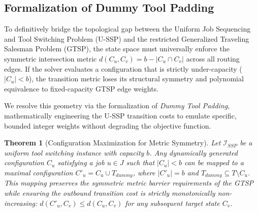 \documentclass[11pt, a4paper]{book}
\newtheorem{theorem}{Theorem}[chapter]
\begin{document}
	\subsection{Formalization of Dummy Tool Padding}
	
	To definitively bridge the topological gap between the Uniform Job Sequencing and Tool Switching Problem (U-SSP) and the restricted Generalized Traveling Salesman Problem (GTSP), the state space must universally enforce the symmetric intersection metric $d(C_u, C_v) = b - |C_u \cap C_v|$ across all routing edges. If the solver evaluates a configuration that is strictly under-capacity ($|C_u| < b$), the transition metric loses its structural symmetry and polynomial equivalence to fixed-capacity GTSP edge weights. 
	
	We resolve this geometry via the formalization of \textit{Dummy Tool Padding}, mathematically engineering the U-SSP transition costs to emulate specific, bounded integer weights without degrading the objective function.
	
	\begin{theorem}[Configuration Maximization for Metric Symmetry]
		Let $\mathcal{I}_{SSP}$ be a uniform tool switching instance with capacity $b$. Any dynamically generated configuration $C_u$ satisfying a job $u \in J$ such that $|C_u| < b$ can be mapped to a maximal configuration $C'_u = C_u \cup T_{dummy}$, where $|C'_u| = b$ and $T_{dummy} \subseteq T \setminus C_u$. This mapping preserves the symmetric metric barrier requirements of the GTSP while ensuring the outbound transition cost is strictly monotonically non-increasing: $d(C'_u, C_v) \le d(C_u, C_v)$ for any subsequent target state $C_v$. %
	\end{theorem}
	
\end{document}
